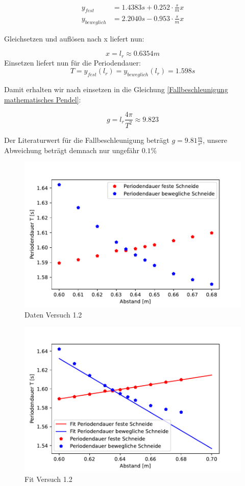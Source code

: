 \begin{align} 
    \nonumber y_{fest} &=  1.4383s + 0.252 \cdot \frac{s}{m} x\\
    \nonumber y_{beweglich} &= 2.2040s -0.953 \cdot \frac{s}{m} x
\end{align}

Gleichsetzen und auflösen nach x liefert nun:

    $$x=l_r \approx 0.6354m $$
    Einsetzen liefert nun für die Periodendauer:
    $$T = y_{fest}(l_r) = y_{beweglich}(l_r) = 1.598 s$$

Damit erhalten wir nach einsetzen in die Gleichung \ref{Fallbeschleunigung mathematisches Pendel}:

$$ g = l_r \frac{4 \pi}{T^2} \approx 9.823 $$

Der Literaturwert für die Fallbeschleunigung beträgt $g=9.81 \frac{m}{s^2}$, unsere Abweichung beträgt demnach nur ungefähr $0.1 \% $

\begin{figure}
    \centering
    \includegraphics[scale=0.8]{Pendel/Protokoll/fig/Pendel Versuch 1.2.pdf}
    \caption{Daten Versuch 1.2}
    \label{fig:Pendel Versuch 1.1}
\end{figure}

\begin{figure}
    \centering
    \includegraphics[scale=0.8]{Pendel/Protokoll/fig/Pendel Versuch 1.2 Fit.pdf}
    \caption{Fit Versuch 1.2}
    \label{fig:Pendel Versuch 1.1 Fit}
\end{figure}